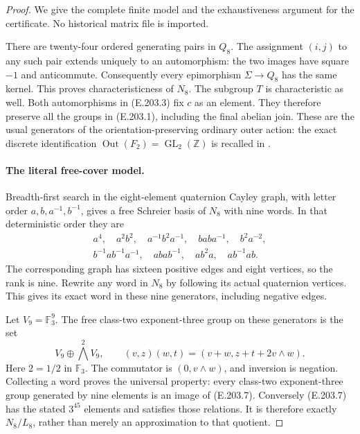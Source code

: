 \begin{proof}
We give the complete finite model and the exhaustiveness argument
for the certificate.  No historical matrix file is imported.

There are twenty-four ordered generating pairs in $Q_8$.  The
assignment $(i,j)$ to any such pair extends uniquely to an
automorphism: the two images have square $-1$ and anticommute.
Consequently every epimorphism $\Sigma\to Q_8$ has the same kernel.
This proves characteristicness of $N_8$.  The subgroup $T$ is
characteristic as well.  Both automorphisms in (E.203.3) fix $c$
as an element.  They therefore preserve all the groups in
(E.203.1), including the final abelian join.  These are the usual
generators of the orientation-preserving ordinary outer action:
the exact discrete identification
$\operatorname{Out}(F_2)=\operatorname{GL}_2(\mathbb Z)$ is recalled
in \citet[\S3, p.335]{LitBuxErshovRapinchuk2011}.

\paragraph{The literal free-cover model.}
Breadth-first search in the eight-element quaternion Cayley graph,
with letter order $a,b,a^{-1},b^{-1}$, gives a free Schreier basis
of $N_8$ with nine words.  In that deterministic order they are
\[
 \begin{gathered}
 a^4,\quad a^2b^2,\quad a^{-1}b^2a^{-1},\quad
 baba^{-1},\quad b^2a^{-2},\\
 b^{-1}ab^{-1}a^{-1},\quad abab^{-1},\quad
 ab^2a,\quad ab^{-1}ab.
 \end{gathered}                                                   \tag{E.203.6}
\]
The corresponding graph has sixteen positive edges and eight
vertices, so the rank is nine.  Rewrite any word in $N_8$ by
following its actual quaternion vertices.  This gives its exact
word in these nine generators, including negative edges.

Let $V_9=\mathbb F_3^9$.  The free class-two exponent-three group on
these generators is the set
\[
 V_9\oplus\bigwedge^2V_9,\qquad
 (v,z)(w,t)=(v+w,z+t+2v\wedge w).                                 \tag{E.203.7}
\]
Here $2=1/2$ in $\mathbb F_3$.  The commutator is $(0,v\wedge w)$,
and inversion is negation.  Collecting a word proves the universal
property: every class-two exponent-three group generated by nine
elements is an image of (E.203.7).  Conversely (E.203.7) has the
stated $3^{45}$ elements and satisfies those relations.  It is
therefore exactly $N_8/L_8$, rather than merely an approximation to
that quotient.


\end{proof}
